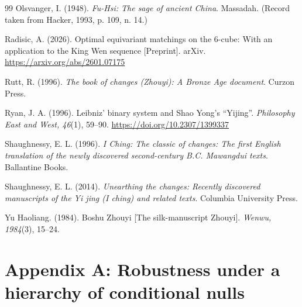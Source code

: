 \documentclass[11pt]{article}
\begin{document}
\begin{thebibliography}{99}
 Olsvanger, I. (1948). \textit{Fu-Hsi: The sage of ancient China}. Massadah. (Record taken from Hacker, 1993, p. 109, n. 14.)

 Radisic, A. (2026). Optimal equivariant matchings on the 6-cube: With an application to the King Wen sequence [Preprint]. arXiv. \url{https://arxiv.org/abs/2601.07175}

 Rutt, R. (1996). \textit{The book of changes (Zhouyi): A Bronze Age document}. Curzon Press.

 Ryan, J. A. (1996). Leibniz' binary system and Shao Yong's ``Yijing''. \textit{Philosophy East and West, 46}(1), 59--90. \url{https://doi.org/10.2307/1399337}

 Shaughnessy, E. L. (1996). \textit{I Ching: The classic of changes: The first English translation of the newly discovered second-century B.C. Mawangdui texts}. Ballantine Books.

 Shaughnessy, E. L. (2014). \textit{Unearthing the changes: Recently discovered manuscripts of the Yi jing (I ching) and related texts}. Columbia University Press.

 Yu Haoliang. (1984). Boshu Zhouyi [The silk-manuscript Zhouyi]. \textit{Wenwu, 1984}(3), 15--24.


\end{thebibliography}

\clearpage
\appendix
\renewcommand{\thetable}{A\arabic{table}}
\renewcommand{\theHtable}{appendix.\arabic{table}}
\setcounter{table}{0}

\section*{Appendix A: Robustness under a hierarchy of conditional nulls}
\end{document}
